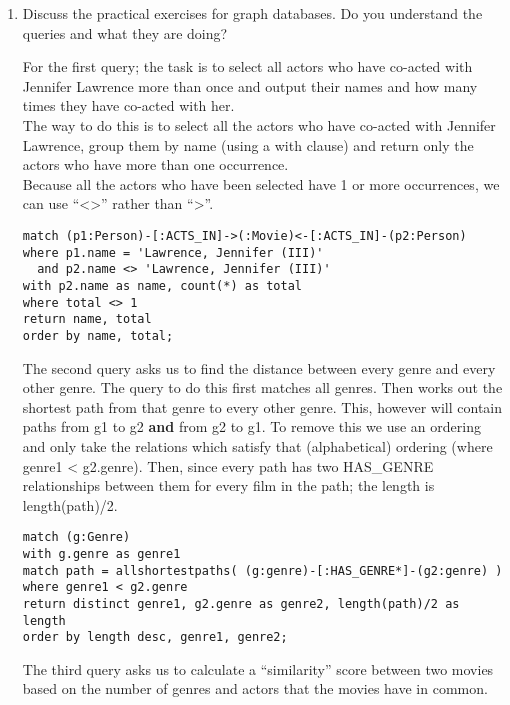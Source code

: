 \documentclass[10pt,\jkfside,a4paper]{article}
\begin{document}
\begin{enumerate}
\item{Discuss the practical exercises for graph databases. Do you 
understand the queries and what they are doing?}

For the first query; the task is to select all actors who have co-acted with 
Jennifer Lawrence more than once and output their names and how many times 
they have co-acted with her.\\
The way to do this is to select all the actors who have co-acted with 
Jennifer Lawrence, group them by name (using a with clause) and return only 
the actors who have more than one occurrence.\\
Because all the actors who have been selected have 1 or more occurrences, we 
can use ``<>'' rather than ``>''.

\begin{verbatim}
match (p1:Person)-[:ACTS_IN]->(:Movie)<-[:ACTS_IN]-(p2:Person)
where p1.name = 'Lawrence, Jennifer (III)'
  and p2.name <> 'Lawrence, Jennifer (III)'
with p2.name as name, count(*) as total
where total <> 1
return name, total
order by name, total;
\end{verbatim}

The second query asks us to find the distance between every genre and every 
other genre. The query to do this first matches all genres. Then works out 
the shortest path from that genre to every other genre. This, however will 
contain paths from g1 to g2 \textbf{and} from g2 to g1. To remove this we 
use an ordering and only take the relations which satisfy that (alphabetical) 
ordering (where genre1 < g2.genre). Then, since every path has two HAS\_GENRE 
relationships between them for every film in the path; the length is 
length(path)/2.

\begin{verbatim}
match (g:Genre)
with g.genre as genre1
match path = allshortestpaths( (g:genre)-[:HAS_GENRE*]-(g2:genre) )
where genre1 < g2.genre
return distinct genre1, g2.genre as genre2, length(path)/2 as length
order by length desc, genre1, genre2;
\end{verbatim}

The third query asks us to calculate a ``similarity'' score between two movies 
based on the number of genres and actors that the movies have in common.


\end{enumerate}
\end{document}
